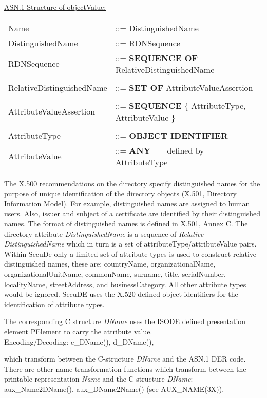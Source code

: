 \underline{ASN.1-Structure of objectValue:}

{\small
\begin {center}
\begin {tabular}{ll}
Name & ::= DistinguishedName    \\
DistinguishedName & ::= RDNSequence              \\
RDNSequence  & ::= {\bf SEQUENCE OF} RelativeDistinguishedName \\
 & \\
RelativeDistinguishedName & ::= {\bf SET OF} AttributeValueAssertion \\
 & \\
AttributeValueAssertion   &
   ::= {\bf SEQUENCE} \{ AttributeType, AttributeValue \} \\
 & \\
AttributeType  &  ::= {\bf OBJECT IDENTIFIER} \\
AttributeValue &  ::= {\bf ANY} -- -- defined by AttributeType
\end {tabular}
\end {center}
}
The X.500 recommendations on the directory specify
distinguished names for the purpose of unique identification of the directory objects
(X.501, Directory Information Model).
For example, distinguished names are assigned to human users.
Also, issuer and subject of a certificate are identified by their distinguished names.
The format of distinguished names is defined in
X.501, Annex C.
The directory attribute {\em DistinguishedName} is a sequence of {\em Relative DistinguishedName}
which in turn is a set of attributeType/attributeValue pairs.
Within SecuDe
only a limited set of attribute types is used to construct relative distinguished names,
these are:
countryName, organizationalName, organizationalUnitName, commonName, surname,
title, serialNumber, localityName, streetAddress, and businessCategory.
All other attribute types would be ignored. SecuDE uses the X.520 defined object identifiers
for the identification of attribute types.

The corresponding C structure {\em DName} uses the ISODE defined presentation element
PElement to carry the attribute value. 
\\ [1em]
Encoding/Decoding: e\_DName(), d\_DName(),

which transform between the C-structure {\em DName} and the ASN.1 DER code.
There are other name transformation functions which transform between
the printable representation {\em Name} and the C-structure {\em DName}: \\
aux\_Name2DName(), aux\_DName2Name() (see AUX\_NAME(3X)).

